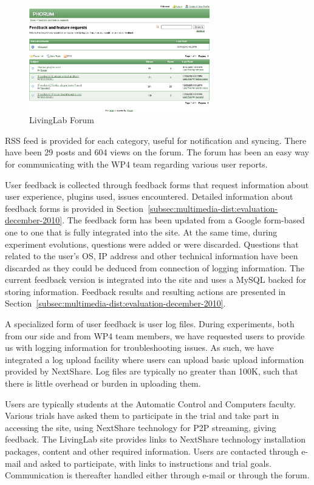\begin{figure}
  \centering
  \includegraphics[width=0.7\textwidth]{src/img/multimedia-dist/upb-living-lab-forum}
  \caption{LivingLab Forum}
  \label{fig:multimedia-dist:upb-living-lab-forum}
\end{figure}

RSS feed is provided for each category, useful for notification and syncing.
There have been 29 posts and 604 views on the forum. The forum has been an
easy way for communicating with the WP4 team regarding various user reports.

User feedback is collected through feedback forms that request information
about user experience, plugins used, issues encountered. Detailed information
about feedback forms is provided in
Section~\ref{subsec:multimedia-dist:evaluation-december-2010}. The feedback
form has been updated from a Google form-based one to one that is fully
integrated into the site. At the same time, during experiment evolutions,
questions were added or were discarded. Questions that related to the user's
OS, IP address and other technical information have been discarded as they
could be deduced from connection of logging information. The current feedback
version is integrated into the site and uses a MySQL backed for storing
information. Feedback results and resulting actions are presented in
Section~\ref{subsec:multimedia-dist:evaluation-december-2010}.

A specialized form of user feedback is user log files. During experiments,
both from our side and from WP4 team members, we have requested users to
provide us with logging information for troubleshooting issues. As such, we
have integrated a log upload facility where users can upload basic upload
information provided by NextShare. Log files are typically no greater than
100K, such that there is little overhead or burden in uploading them.

Users are typically students at the Automatic Control and Computers faculty.
Various trials have asked them to participate in the trial and take part in
accessing the site, using NextShare technology for P2P streaming, giving
feedback. The LivingLab site provides links to NextShare technology
installation packages, content and other required information. Users are
contacted through e-mail and asked to participate, with links to instructions
and trial goals. Communication is thereafter handled either through e-mail or
through the forum.

